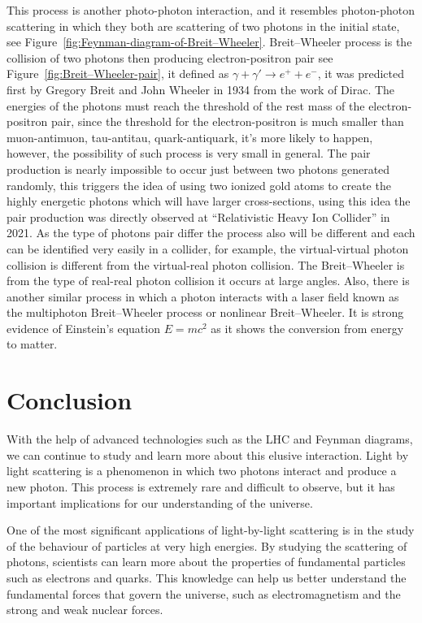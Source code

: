 \documentclass{paper}
\begin{document}
This process is another photo-photon interaction, and it resembles photon-photon scattering in which they both are scattering of two photons in the initial state, see Figure~\ref{fig:Feynman-diagram-of-Breit–Wheeler}.
Breit–Wheeler process is the collision of two photons then producing electron-positron pair see Figure~\ref{fig:Breit–Wheeler-pair}, it defined as
 $\gamma + \gamma' \rightarrow e^+ + e^-$, it was predicted first by Gregory Breit and John Wheeler in 1934 from the work of Dirac.
The energies of the photons must reach the threshold of the rest mass of the electron-positron pair, since the threshold for the electron-positron is much smaller than muon-antimuon, tau-antitau, quark-antiquark, it’s more likely to happen, however, the possibility of such process is very small in general.
The pair production is nearly impossible to occur just between two photons generated randomly, this triggers the idea of using two ionized gold atoms to create the highly energetic photons which will have larger cross-sections, using this idea the pair production was directly observed at “Relativistic Heavy Ion Collider” in 2021.
As the type of photons pair differ the process also will be different and each can be identified very easily in a collider, for example, the virtual-virtual photon collision is different from the virtual-real photon collision. The Breit–Wheeler is from the type of real-real photon collision it occurs at large angles. Also, there is another similar process in which a photon interacts with a laser field known as the multiphoton Breit–Wheeler process or nonlinear Breit–Wheeler.
It is strong evidence of Einstein’s equation $E=mc^2$ as it shows the conversion from energy to matter.



\section{Conclusion}
With the help of advanced technologies such as the LHC and Feynman diagrams, we can continue to study and learn more about this elusive interaction.
Light by light scattering is a phenomenon in which two photons interact and produce a new photon. This process is extremely rare and difficult to observe, but it has important implications for our understanding of the universe.

One of the most significant applications of light-by-light scattering is in the study of the behaviour of particles at very high energies. By studying the scattering of photons, scientists can learn more about the properties of fundamental particles such as electrons and quarks. This knowledge can help us better understand the fundamental forces that govern the universe, such as electromagnetism and the strong and weak nuclear forces.
\end{document}
